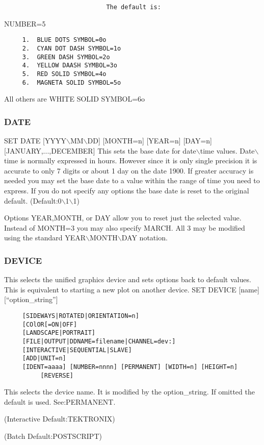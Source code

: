 \begin{verbatim}
                            The default is:
\end{verbatim}
NUMBER=5 
\begin{verbatim}
     1.  BLUE DOTS SYMBOL=0o 
     2.  CYAN DOT DASH SYMBOL=1o 
     3.  GREEN DASH SYMBOL=2o 
     4.  YELLOW DAASH SYMBOL=3o 
     5.  RED SOLID SYMBOL=4o 
     6.  MAGNETA SOLID SYMBOL=5o 
\end{verbatim}
All others are WHITE SOLID SYMBOL=6o 
\subsubsection{DATE}
SET DATE [YYYY$\backslash$MM$\backslash$DD] [MONTH=n] [YEAR=n] [DAY=n] [JANUARY,...,DECEMBER] 
This  sets  the  base date for date$\backslash$time values.  Date$\backslash$time is normally
expressed in hours.  However since it is only single  precision  it  is
accurate  to only 7 digits or about 1 day on the date 1900.  If greater
accuracy is needed you may set the base date  to  a  value  within  the
range  of  time you need to express.  If you do not specify any options
the base date is reset to the original default.  
(Default:0$\backslash$1$\backslash$1) 

Options  YEAR,MONTH, or DAY allow you to reset just the selected value.
Instead of MONTH=3 you may also specify MARCH.  All 3 may  be  modified
using the standard YEAR$\backslash$MONTH$\backslash$DAY notation.  
\subsubsection{DEVICE}
This  selects  the  unified  graphics  device  and sets options back to
default values.  This is equivalent to starting a new plot  on  another
device.  
SET DEVICE [name] [``option\_string''] 
\begin{verbatim}
     [SIDEWAYS|ROTATED|ORIENTATION=n] 
     [COlOR[=ON|OFF] 
     [LANDSCAPE|PORTRAIT] 
     [FILE|OUTPUT|DDNAME=filename|CHANNEL=dev:] 
     [INTERACTIVE|SEQUENTIAL|SLAVE] 
     [ADD|UNIT=n] 
     [IDENT=aaaa] [NUMBER=nnnn] [PERMANENT] [WIDTH=n] [HEIGHT=n]
          [REVERSE] 
\end{verbatim}
This selects the device name.  It is modified by the option\_string.  If
omitted the default is used.  See:PERMANENT.  

(Interactive Default:TEKTRONIX) 

(Batch Default:POSTSCRIPT) 
